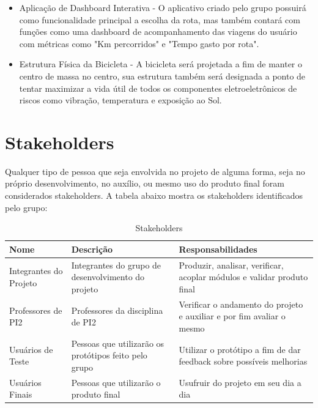\begin{apendicesenv}
\begin{itemize}
	\item Aplicação de Dashboard Interativa - O aplicativo criado pelo grupo possuirá como funcionalidade principal a escolha da rota, mas também contará com funções como uma dashboard de acompanhamento das viagens do usuário com métricas como "Km percorridos" e "Tempo gasto por rota".
	\item Estrutura Física da Bicicleta - A bicicleta será projetada a fim de manter o centro de massa no centro, sua estrutura também será designada a ponto de tentar maximizar a vida útil de todos os componentes eletroeletrônicos de riscos como vibração, temperatura e exposição ao Sol. 
\end{itemize}

\section{Stakeholders}
Qualquer tipo de pessoa que seja envolvida no projeto de alguma forma, seja no próprio desenvolvimento, no auxílio, ou mesmo uso do produto final foram considerados stakeholders.  A tabela abaixo mostra os stakeholders identificados pelo grupo:

\begin{table}[h!]
\centering
\caption{Stakeholders}
\label{my-label}
\begin{tabular}{|p{3cm}p{6cm}p{6cm}|}
\hline
\multicolumn{1}{|l|}{\textbf{Nome}} & \multicolumn{1}{l|}{\textbf{Descrição}}               & \textbf{Responsabilidades}                                             \\ \hline
Integrantes do Projeto              & Integrantes do grupo de desenvolvimento do projeto    & Produzir, analisar, verificar, acoplar módulos e validar produto final \\
Professores de PI2                  & Professores da disciplina de PI2                      & Verificar o andamento do projeto e auxiliar e por fim avaliar o mesmo  \\
Usuários de Teste                   & Pessoas que utilizarão os protótipos feito pelo grupo & Utilizar o protótipo a fim de dar feedback sobre possíveis melhorias   \\
Usuários Finais                     & Pessoas que utilizarão o produto final                & Usufruir do projeto em seu dia a dia                                   \\ \hline
\end{tabular}
\end{table}



\end{apendicesenv}
